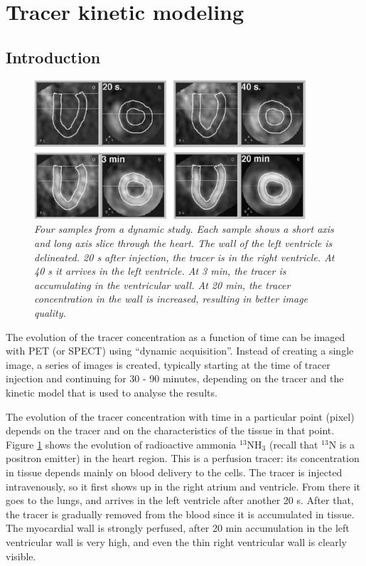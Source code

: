 \section{Tracer kinetic modeling}
\subsection{Introduction}
\begin{figure}[tb]
\centering
\includegraphics[width=0.9\textwidth]{figs/fig_dyncardio.pdf}
\caption{\label{fig:dyncardio} \emph{Four samples from a dynamic
study. Each sample shows a short axis and long axis slice through the
heart. The wall of the left ventricle is delineated. 20 s after
injection, the tracer is in the right ventricle. At 40 s it arrives in
the left ventricle. At 3 min, the tracer is accumulating in the
ventricular wall. At 20 min, the tracer concentration in the wall is
increased, resulting in better image quality.}}
\end{figure}

The evolution of the tracer concentration as a function of time can be
imaged with PET (or SPECT) using ``dynamic acquisition''. Instead of
creating a single image, a series of images is created, typically
starting at the time of tracer injection and continuing for 30 - 90
minutes, depending on the tracer and the kinetic model that is used to
analyse the results.

The evolution of the tracer concentration with time in a particular
point (pixel) depends on the tracer and on the characteristics of the
tissue in that point. Figure \ref{fig:dyncardio} shows the evolution
of radioactive ammonia $^{13}$NH$_3$ (recall that $^{13}$N is a
positron emitter) in the heart region. This is a perfusion tracer: its
concentration in tissue depends mainly on blood delivery to the
cells. The tracer is injected intravenously, so it first shows up in
the right atrium and ventricle. From there it goes to the lungs, and
arrives in the left ventricle after another 20 s. After that, the
tracer is gradually removed from the blood since it is accumulated in
tissue. The myocardial wall is strongly perfused, after 20 min
accumulation in the left ventricular wall is very high, and even the
thin right ventricular wall is clearly visible.

